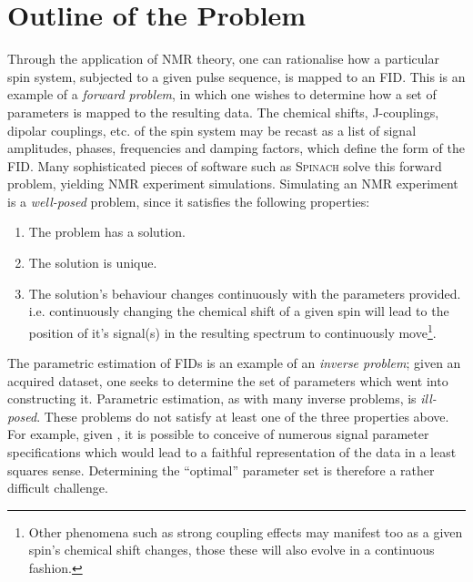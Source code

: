 \section{Outline of the Problem}
\label{sec:theory-outline}
Through the application of \ac{NMR} theory, one can
rationalise how a particular spin system, subjected to a given pulse sequence,
is mapped to an \ac{FID}. This is an example of a \emph{forward problem}, in
which one wishes to determine how a set of parameters is mapped to the
resulting data.
The chemical shifts, J-couplings, dipolar couplings, etc. of the spin system may
be recast as a list of signal amplitudes, phases, frequencies and
damping factors, which define the form of the \ac{FID}.
Many sophisticated pieces of software such as \textsc{Spinach}\cite{Hogben2011}
solve this forward problem, yielding \ac{NMR} experiment simulations.
Simulating an \ac{NMR} experiment is a \emph{well-posed} problem, since it
satisfies the following properties:
\begin{enumerate}
    \item The problem has a solution.
    \item The solution is unique.
    \item The solution's behaviour changes continuously with the parameters
        provided. i.e. continuously changing the chemical shift of a given spin
        will lead to the position of it's signal(s) in the resulting spectrum
        to continuously move\footnote{
            Other phenomena such as strong coupling effects may manifest too as
            a given spin's chemical shift changes, those these will also evolve
            in a continuous fashion.
        }.
\end{enumerate}
The parametric estimation of \acp{FID} is an example of an \emph{inverse problem};
given an acquired dataset, one seeks to determine the set of parameters which
went into constructing it.
Parametric estimation, as with many inverse problems, is
\emph{ill-posed}\cite{Kabanikhin2008}. These problems do not satisfy at least
one of the three properties above. For example, given , it is possible
to conceive of numerous signal parameter specifications which would lead to a
faithful representation of the data in a least squares sense.
Determining the ``optimal'' parameter set is therefore a rather difficult
challenge.

